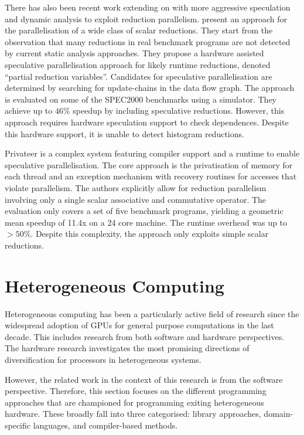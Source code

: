     There has also been recent work extending on \citet{rauchwerger1999lrpd}
    with more aggressive speculation and dynamic analysis
    \citep{aguilar2015unified} to exploit reduction parallelism.
    \citet{Han2010Speculative} present an approach for the
    parallelisation of a wide class of scalar reductions.
    They start from the observation that many reductions in real benchmark
    programs are not detected by current static analysis approaches.
    They propose a hardware assisted speculative parallelisation approach for
    likely runtime reductions, denoted ``partial reduction variables''.
    Candidates for speculative parallelisation are determined by searching for
    update-chains in the data flow graph.
    The approach is evaluated on some of the SPEC2000 benchmarks using a
    simulator.
    They achieve up to $46\%$ speedup by including speculative reductions.
    However, this approach requires hardware speculation support to check
    dependences.
    Despite this hardware support, it is unable to detect histogram reductions.

    Privateer \citep{Johnson:2012:SSP:2254064.2254107} is a complex system
    featuring compiler support and a runtime to enable speculative
    parallelisation.
    The core approach is the privatisation of memory for each thread and an
    exception mechanism with recovery routines for accesses that violate
    parallelism.
    The authors explicitly allow for reduction parallelism involving only a
    single scalar associative and commutative operator.
    The evaluation only covers a set of five benchmark programs, yielding
    a geometric mean speedup of 11.4x on a 24 core machine.
    The runtime overhead was up to $>50\%$.
    Despite this complexity, the approach only exploits simple scalar reductions.

\section{Heterogeneous Computing}

    Heterogeneous computing has been a particularly active field of research
    since the widespread adoption of GPUs for general purpose computations in
    the last decade.
    This includes research from both software and hardware perspectives.
    The hardware research investigates the most promising directions of
    diversification for processors in heterogeneous systems.
    
    However, the related work in the context of this research is from
    the software perspective.
    Therefore, this section focuses on the different programming approaches that
    are championed for programming exiting heterogeneous hardware.
    These broadly fall into three categorised: library approaches,
    domain-specific languages, and compiler-based methods.

